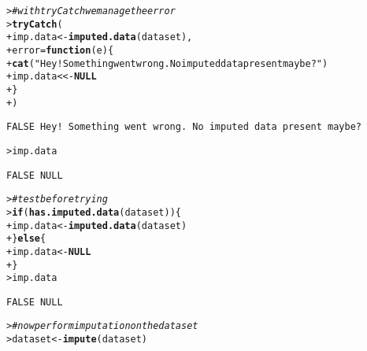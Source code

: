 \documentclass{article}\usepackage[]{graphicx}\usepackage[]{color}
\makeatletter
\newcommand{\hlstr}[1]{\textcolor[rgb]{0.192,0.494,0.8}{#1}}%
\newcommand{\hlcom}[1]{\textcolor[rgb]{0.678,0.584,0.686}{\textit{#1}}}%
\newcommand{\hlstd}[1]{\textcolor[rgb]{0.345,0.345,0.345}{#1}}%
\newcommand{\hlkwa}[1]{\textcolor[rgb]{0.161,0.373,0.58}{\textbf{#1}}}%
\newcommand{\hlkwb}[1]{\textcolor[rgb]{0.69,0.353,0.396}{#1}}%
\newcommand{\hlkwc}[1]{\textcolor[rgb]{0.333,0.667,0.333}{#1}}%
\newcommand{\hlkwd}[1]{\textcolor[rgb]{0.737,0.353,0.396}{\textbf{#1}}}%
\newenvironment{kframe}{%
 \def\at@end@of@kframe{}%
 \ifinner\ifhmode%
  \def\at@end@of@kframe{\end{minipage}}%
  \begin{minipage}{\columnwidth}%
 \fi\fi%
 \def\FrameCommand##1{\hskip\@totalleftmargin \hskip-\fboxsep
 \colorbox{shadecolor}{##1}\hskip-\fboxsep
     \hskip-\linewidth \hskip-\@totalleftmargin \hskip\columnwidth}%
 \MakeFramed {\advance\hsize-\width
   \@totalleftmargin\z@ \linewidth\hsize
   \@setminipage}}%
 {\par\unskip\endMakeFramed%
 \at@end@of@kframe}
\newenvironment{knitrout}{}{} %
\makeatother
\begin{document}
\begin{knitrout}
\begin{kframe}
{\ttfamily\noindent\bfseries\color{errorcolor}{FALSE Error in imputed.data(dataset): The dataset contains no imputed data. Please impute data before learning.\\FALSE See > ?impute for help.}}\begin{alltt}
\hlstd{> }\hlcom{# with tryCatch we manage the error}
\hlstd{> }\hlkwd{tryCatch}\hlstd{(}
\hlstd{+ }  \hlstd{imp.data} \hlkwb{<-} \hlkwd{imputed.data}\hlstd{(dataset),}
\hlstd{+ }  \hlkwc{error} \hlstd{=} \hlkwa{function}\hlstd{(}\hlkwc{e}\hlstd{) \{}
\hlstd{+ }    \hlkwd{cat}\hlstd{(}\hlstr{"Hey! Something went wrong. No imputed data present maybe?"}\hlstd{)}
\hlstd{+ }    \hlstd{imp.data} \hlkwb{<<-} \hlkwa{NULL}
\hlstd{+ }  \hlstd{\}}
\hlstd{+ }\hlstd{)}
\end{alltt}
\begin{verbatim}
FALSE Hey! Something went wrong. No imputed data present maybe?
\end{verbatim}
\begin{alltt}
\hlstd{> }\hlstd{imp.data}
\end{alltt}
\begin{verbatim}
FALSE NULL
\end{verbatim}
\begin{alltt}
\hlstd{> }\hlcom{# test before trying}
\hlstd{> }\hlkwa{if} \hlstd{(}\hlkwd{has.imputed.data}\hlstd{(dataset)) \{}
\hlstd{+ }  \hlstd{imp.data} \hlkwb{<-} \hlkwd{imputed.data}\hlstd{(dataset)}
\hlstd{+ }\hlstd{\}} \hlkwa{else} \hlstd{\{}
\hlstd{+ }  \hlstd{imp.data} \hlkwb{<-} \hlkwa{NULL}
\hlstd{+ }\hlstd{\}}
\hlstd{> }\hlstd{imp.data}
\end{alltt}
\begin{verbatim}
FALSE NULL
\end{verbatim}
\begin{alltt}
\hlstd{> }\hlcom{# now perform imputation on the dataset}
\hlstd{> }\hlstd{dataset} \hlkwb{<-} \hlkwd{impute}\hlstd{(dataset)}
\end{alltt}



\end{kframe}
\end{knitrout}
\end{document}
